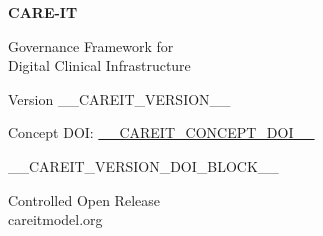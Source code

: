 \begin{titlepage}
\thispagestyle{empty}


\vspace*{4.5cm}

\begin{flushright}

{\Huge\bfseries\color{careitblue} CARE-IT\par}
\vspace{0.8cm}

{\Large Governance Framework for\\
Digital Clinical Infrastructure\par}

\vspace{1.8cm}

{\large Version __CAREIT_VERSION__\par}

\vspace{1.2cm}


{\small\color{black!70}
Concept DOI:\quad
\href{https://doi.org/__CAREIT_CONCEPT_DOI__}
{__CAREIT_CONCEPT_DOI__}
\par}

__CAREIT_VERSION_DOI_BLOCK__

\end{flushright}

\vfill

\begin{flushright}
{\small
Controlled Open Release\\
careitmodel.org
}
\end{flushright}

\end{titlepage}
\clearpage